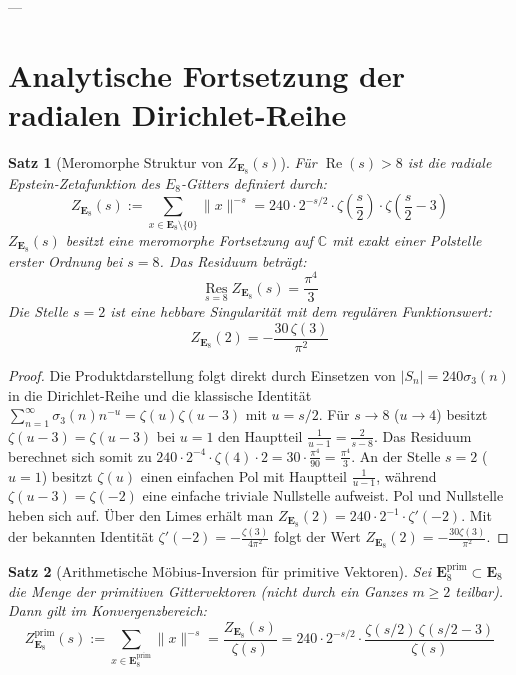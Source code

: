 \documentclass[11pt,a4paper]{article}
\newtheorem{theorem}{Satz}
\begin{document}
	---
	
	\section{Analytische Fortsetzung der radialen Dirichlet-Reihe}
	
	\begin{theorem}[Meromorphe Struktur von $Z_{\mathbf{E}_8}(s)$]
		Für $\operatorname{Re}(s) > 8$ ist die radiale Epstein-Zetafunktion des $E_8$-Gitters definiert durch:
		$$Z_{\mathbf{E}_8}(s) := \sum_{x \in \mathbf{E}_8 \setminus \{0\}} \|x\|^{-s} = 240 \cdot 2^{-s/2} \cdot \zeta\left(\frac{s}{2}\right) \cdot \zeta\left(\frac{s}{2} - 3\right)$$
		$Z_{\mathbf{E}_8}(s)$ besitzt eine meromorphe Fortsetzung auf $\mathbb{C}$ mit exakt einer Polstelle erster Ordnung bei $s = 8$. Das Residuum beträgt:
		$$\operatorname*{Res}_{s=8} Z_{\mathbf{E}_8}(s) = \frac{\pi^4}{3}$$
		Die Stelle $s = 2$ ist eine hebbare Singularität mit dem regulären Funktionswert:
		$$Z_{\mathbf{E}_8}(2) = -\frac{30\,\zeta(3)}{\pi^2}$$
	\end{theorem}
	
	\begin{proof}
		Die Produktdarstellung folgt direkt durch Einsetzen von $|S_n| = 240 \sigma_3(n)$ in die Dirichlet-Reihe und die klassische Identität $\sum_{n=1}^\infty \sigma_3(n) n^{-u} = \zeta(u)\zeta(u-3)$ mit $u = s/2$.
		Für $s \to 8$ ($u \to 4$) besitzt $\zeta(u-3) = \zeta(u-3)$ bei $u=1$ den Hauptteil $\frac{1}{u-1} = \frac{2}{s-8}$. Das Residuum berechnet sich somit zu $240 \cdot 2^{-4} \cdot \zeta(4) \cdot 2 = 30 \cdot \frac{\pi^4}{90} = \frac{\pi^4}{3}$.
		An der Stelle $s = 2$ ($u = 1$) besitzt $\zeta(u)$ einen einfachen Pol mit Hauptteil $\frac{1}{u-1}$, während $\zeta(u-3) = \zeta(-2)$ eine einfache triviale Nullstelle aufweist. Pol und Nullstelle heben sich auf. Über den Limes erhält man $Z_{\mathbf{E}_8}(2) = 240 \cdot 2^{-1} \cdot \zeta'(-2)$. Mit der bekannten Identität $\zeta'(-2) = -\frac{\zeta(3)}{4\pi^2}$ folgt der Wert $Z_{\mathbf{E}_8}(2) = -\frac{30\zeta(3)}{\pi^2}$.
	\end{proof}
	
	\begin{theorem}[Arithmetische Möbius-Inversion für primitive Vektoren]
		Sei $\mathbf{E}_8^{\text{prim}} \subset \mathbf{E}_8$ die Menge der primitiven Gittervektoren (nicht durch ein Ganzes $m \ge 2$ teilbar). Dann gilt im Konvergenzbereich:
		$$Z_{\mathbf{E}_8}^{\text{prim}}(s) := \sum_{x \in \mathbf{E}_8^{\text{prim}}} \|x\|^{-s} = \frac{Z_{\mathbf{E}_8}(s)}{\zeta(s)} = 240 \cdot 2^{-s/2} \cdot \frac{\zeta(s/2)\,\zeta(s/2 - 3)}{\zeta(s)}$$
	\end{theorem}
	
\end{document}
